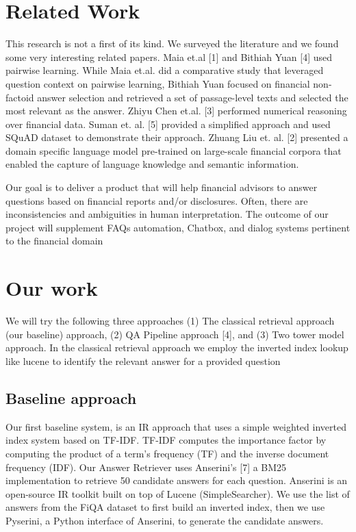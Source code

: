 \documentclass[11pt,a4paper]{article}
\begin{document}
\section{Related Work}
\label{sec:length}

This research is not a first of its kind. We surveyed the literature and we found some very interesting related papers. Maia et.al [1] and Bithiah Yuan [4] used pairwise learning. While Maia et.al. did a comparative study that leveraged question context on pairwise learning, Bithiah Yuan focused on financial non-factoid answer selection and retrieved a  set of passage-level texts and selected the most relevant as the answer. Zhiyu Chen et.al. [3] performed numerical reasoning over financial data. Suman et. al. [5] provided a simplified approach and used SQuAD dataset to demonstrate their approach. Zhuang Liu et. al. [2] presented a domain specific language model pre-trained on large-scale financial corpora that enabled the capture of language knowledge and semantic information.

Our goal is to deliver a product that will help financial advisors to answer questions based on financial reports and/or disclosures. Often, there are inconsistencies and ambiguities in human interpretation. The outcome of our project will supplement FAQs automation, Chatbox, and dialog systems pertinent to the financial domain


\section{Our work}
We will try the following three approaches (1) The classical retrieval approach (our baseline) approach, (2) QA Pipeline approach [4], and (3) Two tower model approach. In the classical retrieval approach we employ the inverted index lookup like lucene to identify the relevant answer for a provided question



\subsection{Baseline approach}
\label{sect:pdf}
Our first baseline system, is an IR approach that uses a simple weighted inverted index system based on TF-IDF. TF-IDF computes the importance factor by computing the product of a term’s frequency (TF) and the inverse document frequency (IDF). Our Answer Retriever uses Anserini’s [7] a BM25 implementation to retrieve 50 candidate answers for each question. Anserini is an open-source IR toolkit built on top of Lucene (SimpleSearcher). We use the list of answers from the FiQA dataset to first build an inverted index, then we use Pyserini, a Python interface of Anserini, to generate the candidate answers.
\end{document}
